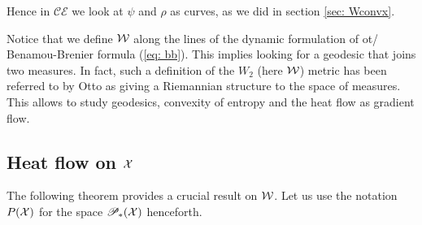 Hence in $\mathcal{CE}$ we look at $\psi$ and $\rho$ as curves, as we did in section \ref{sec: Wconvx}. 

Notice that we define $\mathcal{W}$ along the lines of the dynamic formulation of ot/ Benamou-Brenier formula (\ref{eq: bb}). This implies looking for a geodesic that joins two measures. In fact, such a definition of the $W_2$ (here $\mathcal{W}$) metric has been referred to by Otto as giving a Riemannian structure to the space of measures. This allows to study geodesics, convexity of entropy and the heat flow as gradient flow. 
\\
\subsection{Heat flow on $\mathcal{X}$}
The following theorem provides a crucial result on $\mathcal{W}$. Let us use the notation $P(\mathcal{X})$ for the space $\mathscr{P}_*(\mathcal{X})$ henceforth. 


